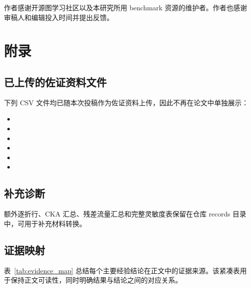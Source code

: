 \documentclass[UTF8,10pt]{ctexart}
\begin{document}
作者感谢开源图学习社区以及本研究所用 benchmark 资源的维护者。作者也感谢审稿人和编辑投入时间并提出反馈。

\appendix

\section{附录}
\label{sec:appendix}

\subsection{已上传的佐证资料文件}

下列 CSV 文件均已随本次投稿作为佐证资料上传，因此不再在论文中单独展示：
\begin{itemize}
    \item {}
    \item {}
    \item {}
    \item {}
    \item {}
    \item {}
\end{itemize}

\subsection{补充诊断}

额外逐折行、CKA 汇总、残差流量汇总和完整灵敏度表保留在仓库 records 目录中，可用于补充材料转换。

\subsection{证据映射}

表~\ref{tab:evidence_map} 总结每个主要经验结论在正文中的证据来源。该紧凑表用于保持正文可读性，同时明确结果与结论之间的对应关系。
\end{document}
